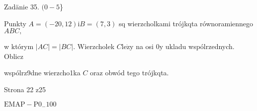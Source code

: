 \documentclass[a4paper,12pt]{article}
\begin{document}
Zadänie 35. $(0-5$\}

Punkty $A=(-20,12) \mathrm{i} B=(7,3)$ sq wierzcholkami trójkqta równoramiennego $ABC,$

w którym $|AC|=|BC|$. Wierzcholek $C \mathrm{l}\mathrm{e}\dot{\mathrm{z}}\mathrm{y}$ na osi $0\mathrm{y}$ ukladu wspólrzednych. Oblicz

wspólrz9dne wierzcho1ka $C$ oraz obwód tego trójkqta.

Strona 22 z25

$\mathrm{E}\mathrm{M}\mathrm{A}\mathrm{P}-\mathrm{P}0_{-}100$
\end{document}
